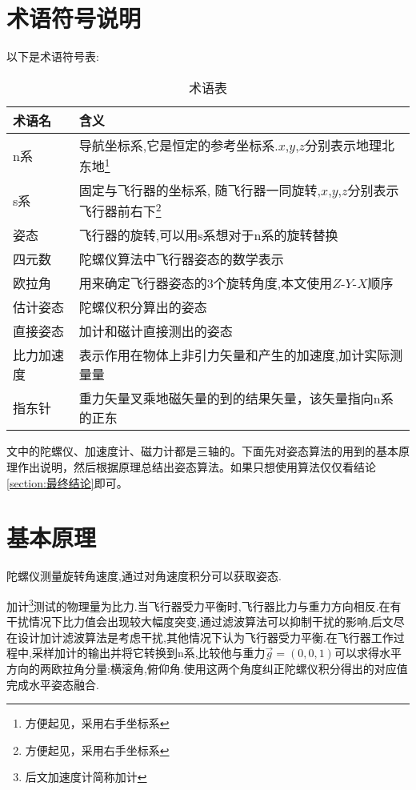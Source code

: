 \documentclass[10pt,a4paper]{article}
\begin{document}
\section{术语符号说明} 
以下是术语符号表:
\begin{table}[!hbp]
\begin{center}
    \begin{tabular}{|l|l|}
        \hline
        术语名 & 含义 \\
        \hline
        n系 & 导航坐标系,它是恒定的参考坐标系.$x$,$y$,$z$分别表示地理北东地\footnote{方便起见，采用右手坐标系} \\
        \hline
        s系 & 固定与飞行器的坐标系, 随飞行器一同旋转,$x$,$y$,$z$分别表示飞行器前右下\footnote{方便起见，采用右手坐标系} \\
        \hline
        姿态 & 飞行器的旋转,可以用s系想对于n系的旋转替换 \\
        \hline
        四元数 & 陀螺仪算法中飞行器姿态的数学表示 \\
        \hline
        欧拉角 & 用来确定飞行器姿态的3个旋转角度,本文使用$Z$-$Y$-$X$顺序 \\
        \hline
        估计姿态 & 陀螺仪积分算出的姿态 \\
        \hline
        直接姿态 & 加计和磁计直接测出的姿态 \\
        \hline
        比力加速度 & 表示作用在物体上非引力矢量和产生的加速度,加计实际测量量 \\
        \hline
        指东针 & 重力矢量叉乘地磁矢量的到的结果矢量，该矢量指向n系的正东 \\
        \hline
    \end{tabular}
    \caption{术语表\label{术语表}}
\end{center}
\end{table}

文中的陀螺仪、加速度计、磁力计都是三轴的。下面先对姿态算法的用到的基本原理作出说明，然后根据原理总结出姿态算法。如果只想使用算法仅仅看结论\ref{section:最终结论}即可。
\newpage

\section{基本原理}
陀螺仪测量旋转角速度,通过对角速度积分可以获取姿态.

加计\footnote{后文加速度计简称加计}测试的物理量为比力.当飞行器受力平衡时,飞行器比力与重力方向相反.在有干扰情况下比力值会出现较大幅度突变,通过滤波算法可以抑制干扰的影响,后文尽在设计加计滤波算法是考虑干扰,其他情况下认为飞行器受力平衡.在飞行器工作过程中,采样加计的输出并将它转换到n系,比较他与重力$\vec{g}=(0,0,1)$可以求得水平方向的两欧拉角分量:横滚角,俯仰角.使用这两个角度纠正陀螺仪积分得出的对应值完成水平姿态融合.
\end{document}

